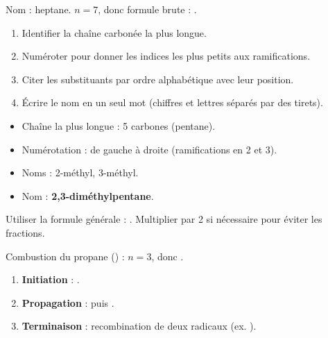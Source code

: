 \begin{exemple}
Nom : heptane. \(n=7\), donc formule brute : .
\end{exemple}

\begin{enumerate}
    \item Identifier la chaîne carbonée la plus longue.
    \item Numéroter pour donner les indices les plus petits aux ramifications.
    \item Citer les substituants par ordre alphabétique avec leur position.
    \item Écrire le nom en un seul mot (chiffres et lettres séparés par des tirets).
\end{enumerate}

\begin{exemple}
\begin{itemize}
    \item Chaîne la plus longue : 5 carbones (pentane).
    \item Numérotation : de gauche à droite (ramifications en 2 et 3).
    \item Noms : 2-méthyl, 3-méthyl.
    \item Nom : \textbf{2,3-diméthylpentane}.
\end{itemize}
\end{exemple}

Utiliser la formule générale : . Multiplier par 2 si nécessaire pour éviter les fractions.

\begin{exemple}
Combustion du propane () : \(n=3\), donc .
\end{exemple}

\begin{enumerate}
    \item \textbf{Initiation} : .
    \item \textbf{Propagation} :  puis .
    \item \textbf{Terminaison} : recombination de deux radicaux (ex. ).
\end{enumerate}

